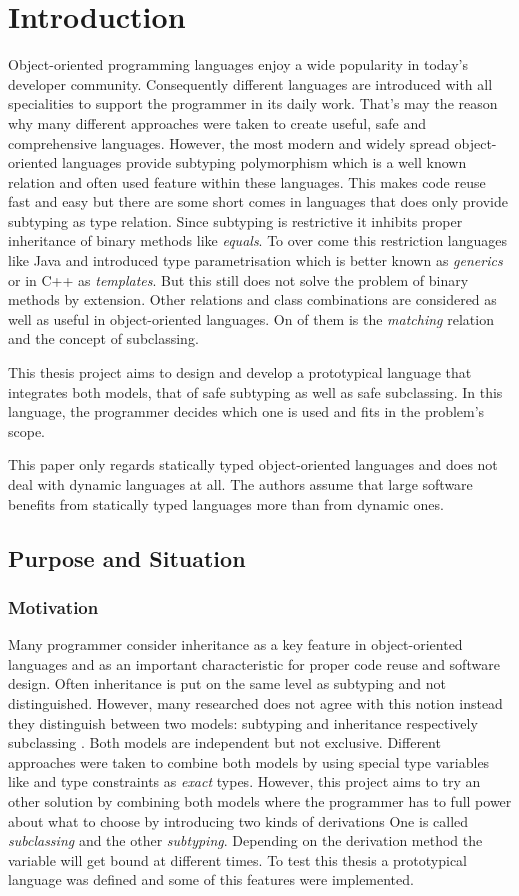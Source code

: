 \chapter{Introduction}
Object-oriented programming languages enjoy a wide popularity in today's
developer community. Consequently different languages are introduced with
all specialities to support the programmer in its daily work. That's may
the reason why many different approaches were taken to create useful, safe
and comprehensive languages. However, the most modern and widely spread
object-oriented languages provide subtyping polymorphism which is a well
known relation and often used feature within these languages. This makes
code reuse fast and easy but there are some short comes in languages
that does only provide subtyping as type relation. Since subtyping
is restrictive it inhibits proper inheritance of binary methods like
\emph{equals}. To over come this restriction languages like Java and \cs
introduced type parametrisation which is better known as \emph{generics}
or in C++ as \emph{templates}. But this still does not solve the problem
of binary methods by extension. Other relations and class combinations
are considered as well as useful in object-oriented languages. On of them
is the \emph{matching} relation and the concept of subclassing.

This thesis project aims to design and develop a prototypical language
that integrates both models, that of safe subtyping as well as safe
subclassing. In this language, the programmer decides which one is used
and fits in the problem's scope.

This paper only regards statically typed object-oriented languages and does
not deal with dynamic languages at all. The authors assume that large
software benefits from statically typed languages more than from dynamic
ones.

\section{Purpose and Situation}
\subsection{Motivation}
Many programmer consider inheritance as a key feature in object-oriented
languages and as an important characteristic for proper code reuse and
software design. Often inheritance is put on the same level as subtyping
and not distinguished. However, many researched does not agree with
this notion instead they distinguish between two models: subtyping and
inheritance respectively subclassing \cite{taivalsaari_notion_1996}.
Both models are independent but not exclusive. Different approaches were
taken to combine both models by using special type variables like \mytype
and type constraints as \emph{exact} types. However, this project aims to
try an other solution by combining both models where the programmer has
to full power about what to choose by introducing two kinds of derivations
One is called \emph{subclassing} and the other \emph{subtyping}. Depending
on the derivation method the \mytype variable will get bound at different
times. To test this thesis a prototypical language was defined and some
of this features were implemented.

